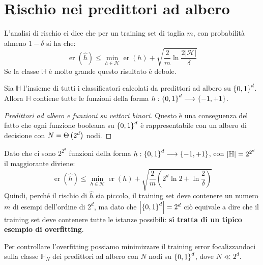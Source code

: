 \documentclass[\main/main.tex]{subfiles}
\begin{document}
\chapter{Rischio nei predittori ad albero}
\begin{multicols}{2}
    \begin{observation}
        L'analisi di rischio ci dice che per un training set di taglia \(m\), con probabilità almeno \(1-\delta\) si ha che:
        \[
            \operatorname{er}(\widehat{h}) \leq \min _{h \in \mathcal{H}} \operatorname{er}(h)+\sqrt{\frac{2}{m} \ln \frac{2|\mathcal{H}|}{\delta}}
        \]
        Se la classe \(\mathbb{H}\) è molto grande questo risultato è debole.
    \end{observation}
    \begin{fact}
        Sia \(\mathbb{H}\) l'insieme di tutti i classificatori calcolati da predittori ad albero su \(\left\{0,1\right\}^d\). Allora \(\mathbb{H}\) contiene tutte le funzioni  della forma \(h:\left\{0,1\right\}^d\longrightarrow \left\{-1, +1\right\}\).
    \end{fact}
    \begin{proof}[Predittori ad albero e funzioni su vettori binari]
        Questo è una conseguenza del fatto che ogni funzione booleana su \(\left\{0,1\right\}^d\) è rappresentabile con un albero di decisione con \(N = \Theta\left(2^d\right)\) nodi.
    \end{proof}
    \begin{observation}
        Dato che ci sono \(2^{2^d}\) funzioni della forma \(h:\left\{0,1\right\}^d\longrightarrow \left\{-1, +1\right\}\), con \(\left\lvert\mathbb{H}\right\rvert = 2^{2^d}\) il maggiorante diviene:
        \[
            \operatorname{er}(\widehat{h}) \leq \min _{h \in \mathcal{H}} \operatorname{er}(h)+\sqrt{\frac{2}{m}\left(2^{d} \ln 2+\ln \frac{2}{\delta}\right)}
        \]
        Quindi, perché il rischio di \(\hat{h}\) sia piccolo, il training set deve contenere un numero \(m\) di esempi dell'ordine di \(2^d\), ma dato che \(\left\lvert\left\{0,1\right\}^d\right\rvert = 2^d\) ciò equivale a dire che il training set deve contenere tutte le istanze possibili: \textbf{si tratta di un tipico esempio di overfitting}.
    \end{observation}
    \begin{observation}
        Per controllare l'overfitting possiamo minimizzare il training error focalizzandoci sulla classe \(\mathbb{H}_N\) dei predittori ad albero con \(N\) nodi su \(\left\{0,1\right\}^d\), dove \(N \ll 2^d\).

\end{observation}
\end{multicols}
\end{document}
